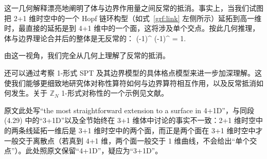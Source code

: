 这一几何解释漂亮地阐明了体与边界作用量之间反常的抵消。事实上，当我们试图把 2+1 维时空中的一个 Hopf 链环构型（如式~\ref{grf:link} 左侧所示）延拓到高一维时，最直接的延拓是到 4+1 维中的一个面，这将涉及单个交点。按此几何推理，体与边界理论合并后的整体是无反常的：
\be  (-1)^{} \cdot (-1)^{} = 1.  \  \ee

由这一视角，我们完全从几何上理解了反常的抵消。

\begin{center}
\end{center}

还可以通过考察 1-形式 SPT 及其边界模型的具体格点模型来进一步加深理解。这使我们能够更细致地研究体对称性算符如何与边界算符相互作用，以及反常抵消如何发生。关于 $\mathbb{Z}_N$ 1-形式对称性的一个示例见文献\cite{PhysRevB.101.035101}。

\begin{yizhu}[原文疑误]原文此处写“the most straightforward extension to a surface in 4+1D”，与同段 (4.29) 中的“3+1D”以及全节始终在 3+1 维体中讨论的事实不一致：2+1 维时空中的两条线延拓一维后是 3+1 维时空中的两个面，而正是两个面在 3+1 维时空中才一般交于离散点（若真到 4+1 维，两个面一般交于 1 维曲线，不会给出“单个交点”）。此处照原文保留“4+1D”，疑应为“3+1D”。\end{yizhu}

